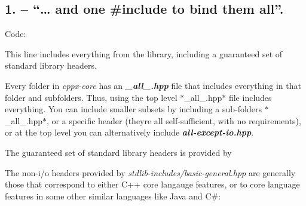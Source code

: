 \begin{DoxyCode}{0}
\DoxyCodeLine{}
\DoxyCodeLine{    \textcolor{keywordflow}{try}}
\DoxyCodeLine{    \{}
\DoxyCodeLine{    \}}
\DoxyCodeLine{    \{}
\DoxyCodeLine{    \}}
\DoxyCodeLine{\}}
\end{DoxyCode}


\subsection*{1. – “… and one {\ttfamily \#include} to bind them all”.}

Code\+:


\begin{DoxyCode}{0}
\DoxyCodeLine{\textcolor{preprocessor}{\#include <cppx-core/\_all\_.hpp>}}
\end{DoxyCode}


This line includes everything from the library, including a guaranteed set of standard library headers.

Every folder in {\itshape cppx-\/core} has an {\itshape {\bfseries{\+\_\+all\+\_\+.\+hpp}}} file that includes everything in that folder and subfolders. Thus, using the top level $\ast$\+\_\+all\+\_\+.hpp$\ast$ file includes everything. You can include smaller subsets by including a sub-\/folder\textquotesingle{}s $\ast$\+\_\+all\+\_\+.hpp$\ast$, or a specific header (they\textquotesingle{}re all self-\/sufficient, with no requirements), or at the top level you can alternatively include {\itshape {\bfseries{all-\/except-\/io.\+hpp}}}.

The guaranteed set of standard library headers is provided by


\begin{DoxyCode}{0}
\DoxyCodeLine{\textcolor{preprocessor}{\#include <cppx-core/stdlib-includes/basic-general.hpp>}}
\DoxyCodeLine{\textcolor{preprocessor}{\#include <cppx-core/stdlib-includes/basic-io.hpp>}}
\end{DoxyCode}


The non-\/i/o headers provided by {\itshape stdlib-\/includes/basic-\/general.\+hpp} are generally those that correspond to either C++ core langauge features, or to core language features in some other similar languages like Java and C\#\+:


